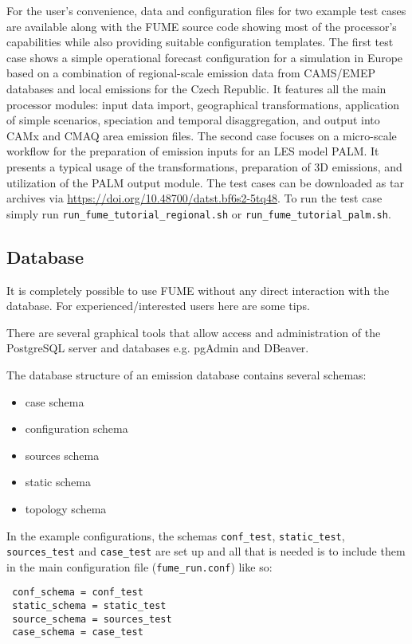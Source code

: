 \documentclass[a4paper,11pt]{article}
\begin{document}
For the user's convenience, data and configuration files for two example test cases are available along with the FUME source code showing most of the processor's capabilities while also providing suitable configuration templates. The first test case shows a simple operational forecast configuration for a simulation in Europe based on a combination of regional-scale emission data from CAMS/EMEP databases and local emissions for the Czech Republic. It features all the main processor modules: input data import, geographical transformations, application of simple scenarios, speciation and temporal disaggregation, and output into CAMx and CMAQ area emission files. The second case focuses on a micro-scale workflow for the preparation of emission inputs for an LES model PALM. It presents a typical usage of the transformations, preparation of 3D emissions, and utilization of the PALM output module. The test cases can be downloaded as tar archives via \url{https://doi.org/10.48700/datst.bf6s2-5tq48}. To run the test case simply run \verb|run_fume_tutorial_regional.sh| or \verb|run_fume_tutorial_palm.sh|.

\subsection{Database}\label{database}
It is completely possible to use FUME without any direct interaction with the database. For experienced/interested users here are some tips.   

There are several graphical tools that allow access and administration of the PostgreSQL server and databases e.g. pgAdmin and DBeaver. 

The database structure of an emission database contains several schemas:
\begin{itemize}
\item
  case schema
\item
  configuration schema
\item
  sources schema
\item
  static schema
\item
  topology schema
\end{itemize}

In the example configurations, the
schemas \verb|conf_test|, \verb|static_test|, \verb|sources_test| and \verb|case_test|
are set up and all that is needed is to include them in the main
configuration file (\verb|fume_run.conf|) like so:
\begin{verbatim}
 conf_schema = conf_test 
 static_schema = static_test 
 source_schema = sources_test 
 case_schema = case_test 
\end{verbatim}
\end{document}
